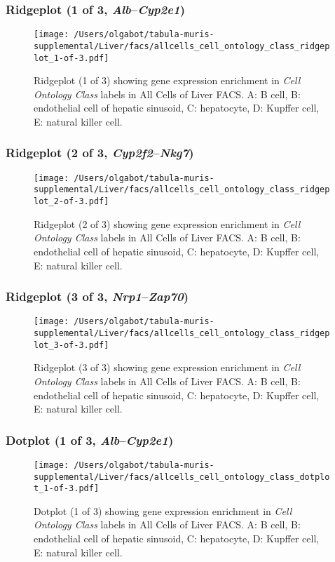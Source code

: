 \subsubsection{Ridgeplot (1 of 3, \emph{Alb}--\emph{Cyp2e1})}
\begin{figure}[h]
\centering
\texttt{[image: /Users/olgabot/tabula-muris-supplemental/Liver/facs/allcells\_cell\_ontology\_class\_ridgeplot\_1-of-3.pdf]}

\caption{ Ridgeplot (1 of 3)  showing gene expression enrichment in \emph{Cell Ontology Class} labels in All Cells of Liver FACS. A: B cell, B: endothelial cell of hepatic sinusoid, C: hepatocyte, D: Kupffer cell, E: natural killer cell.}
\end{figure}


\clearpage

\subsubsection{Ridgeplot (2 of 3, \emph{Cyp2f2}--\emph{Nkg7})}
\begin{figure}[h]
\centering
\texttt{[image: /Users/olgabot/tabula-muris-supplemental/Liver/facs/allcells\_cell\_ontology\_class\_ridgeplot\_2-of-3.pdf]}

\caption{ Ridgeplot (2 of 3)  showing gene expression enrichment in \emph{Cell Ontology Class} labels in All Cells of Liver FACS. A: B cell, B: endothelial cell of hepatic sinusoid, C: hepatocyte, D: Kupffer cell, E: natural killer cell.}
\end{figure}


\clearpage

\subsubsection{Ridgeplot (3 of 3, \emph{Nrp1}--\emph{Zap70})}
\begin{figure}[h]
\centering
\texttt{[image: /Users/olgabot/tabula-muris-supplemental/Liver/facs/allcells\_cell\_ontology\_class\_ridgeplot\_3-of-3.pdf]}

\caption{ Ridgeplot (3 of 3)  showing gene expression enrichment in \emph{Cell Ontology Class} labels in All Cells of Liver FACS. A: B cell, B: endothelial cell of hepatic sinusoid, C: hepatocyte, D: Kupffer cell, E: natural killer cell.}
\end{figure}


\clearpage

\subsubsection{Dotplot (1 of 3, \emph{Alb}--\emph{Cyp2e1})}
\begin{figure}[h]
\centering
\texttt{[image: /Users/olgabot/tabula-muris-supplemental/Liver/facs/allcells\_cell\_ontology\_class\_dotplot\_1-of-3.pdf]}

\caption{ Dotplot (1 of 3)  showing gene expression enrichment in \emph{Cell Ontology Class} labels in All Cells of Liver FACS. A: B cell, B: endothelial cell of hepatic sinusoid, C: hepatocyte, D: Kupffer cell, E: natural killer cell.}
\end{figure}


